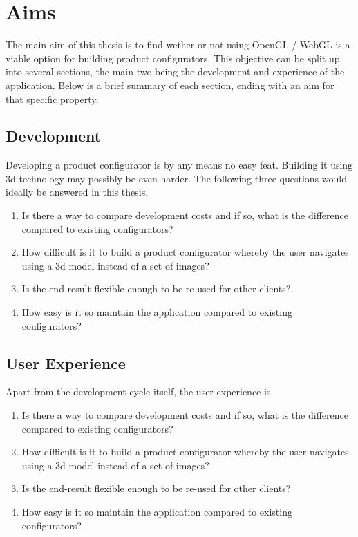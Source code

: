 \chapter{Aims}
The main aim of this thesis is to find wether or not using OpenGL / WebGL is a viable option for building product configurators. This objective can be split up into several sections, the main two being the development and experience of the application. Below is a brief summary of each section, ending with an aim for that specific property.

\section{Development}
Developing a product configurator is by any means no easy feat. Building it using 3d technology may possibly be even harder. The following three questions would ideally be answered in this thesis.
\begin{enumerate}
\item Is there a way to compare development costs and if so, what is the difference compared to existing configurators?
\item How difficult is it to build a product configurator whereby the user navigates using a 3d model instead of a set of images?
\item Is the end-result flexible enough to be re-used for other clients?
\item How easy is it so maintain the application compared to existing configurators?
\end{enumerate}

\section{User Experience}
Apart from the development cycle itself, the user experience is 
\begin{enumerate}
\item Is there a way to compare development costs and if so, what is the difference compared to existing configurators?
\item How difficult is it to build a product configurator whereby the user navigates using a 3d model instead of a set of images?
\item Is the end-result flexible enough to be re-used for other clients?
\item How easy is it so maintain the application compared to existing configurators?
\end{enumerate}
